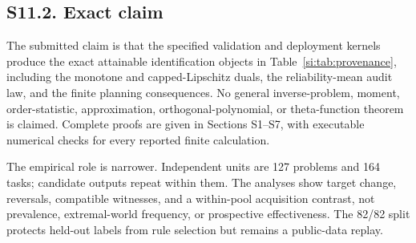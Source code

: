 \documentclass[10pt,twocolumn]{article}
\begin{document}
\subsection*{S11.2. Exact claim}

The submitted claim is that the specified validation and deployment kernels
produce the exact attainable identification objects in
Table~\ref{si:tab:provenance}, including the monotone and capped-Lipschitz duals,
the reliability-mean audit law, and the finite planning consequences. No general
inverse-problem, moment, order-statistic, approximation, orthogonal-polynomial,
or theta-function theorem is claimed. Complete proofs are given in Sections
S1--S7, with executable numerical checks for every reported finite calculation.

The empirical role is narrower. Independent units are 127 problems and 164
tasks; candidate outputs repeat within them. The analyses show target change,
reversals, compatible witnesses, and a within-pool acquisition contrast, not
prevalence, extremal-world frequency, or prospective effectiveness. The 82/82
split protects held-out labels from rule selection but remains a public-data
replay.
\end{document}
